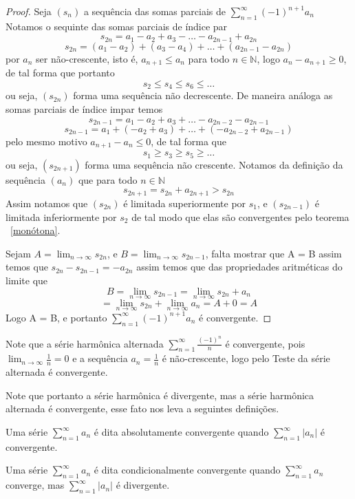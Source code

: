 \begin{proof}
    Seja $(s_n)$ a sequência das somas parciais de $\sum_{n =1}^{\infty} (-1)^{n+1} a_n$
    Notamos o sequinte das somas parciais de índice par
    $$s_{2n} = a_1 - a_2 +a_3 - \dots -a_{2n-1} + a_{2n}$$
    $$s_{2n} = (a_1 - a_2) + (a_3 - a_4) + \dots + (a_{2n-1} - a_{2n})$$
    por $a_n$ ser não-crescente, isto é, $a_{n+1} \leq a_n$ para todo $n \in \mathbb{N}$,
    logo $a_n - a_{n+1} \geq 0$, de tal forma que portanto
    $$s_2 \leq s_4 \leq s_6 \leq  \dots $$
    ou seja, $(s_{2n})$ forma uma sequência não decrescente.
    De maneira análoga as somas parciais de índice impar temos
    $$s_{2n-1} = a_1 - a_2 +a_3 + \dots -a_{2n-2} - a_{2n-1}$$
    $$s_{2n-1} =a_1 +(- a_2 + a_3) + \dots + (-a_{2n-2} + a_{2n-1})$$
    pelo mesmo motivo $a_{n+1} - a_n \leq 0$, de tal forma que
    $$s_1 \geq s_3 \geq s_5 \geq \dots $$
    ou seja, $(s_{2n+1})$ forma uma sequência não crescente.
    Notamos da definição da sequência $(a_n)$ que para todo $n \in \mathbb{N}$
    $$ s_{2n+1} = s_{2n} + a_{2n+1} > s_{2n}$$
    Assim notamos que $(s_{2n})$ é limitada superiormente por $s_1$, e
    $(s_{2n-1})$ é limitada inferiormente por $s_2$ de tal modo que elas são
    convergentes pelo teorema ~\ref{monótona}.
    
    Sejam $A = \lim_{n \to \infty} s_{2n}$, e $B = \lim_{n \to \infty} s_{2n-1}$, falta mostrar que A = B
    assim temos que $s_{2n} - s_{2n-1} = -a_{2n}$ assim temos que
    das propriedades aritméticas do limite que
    $$ B = \lim_{n \to \infty} s_{2n-1} = \lim_{n \to \infty} s_{2n} + a_n$$
    $$ = \lim_{n \to \infty} s_{2n} + \lim_{n \to \infty} a_n = A + 0 = A$$
    Logo A = B, e portanto $\sum_{n =1}^{\infty} (-1)^{n+1} a_n$ é convergente.
\end{proof}

\begin{ex}
    Note que a série harmônica alternada $\sum_{n = 1}^{\infty} \frac{(-1)^n}{n}$
    é convergente, pois $\lim_{n \to \infty} \frac{1}{n} = 0$ e a sequência 
    $a_n = \frac{1}{n}$ é não-crescente, logo pelo Teste da série alternada é
    convergente.
\end{ex}

Note que portanto a série harmônica é divergente, mas a série harmônica alternada
é convergente, esse fato nos leva a seguintes definições.

Uma série $\sum_{n =1}^{\infty} a_n$ é dita absolutamente convergente quando
$\sum_{n =1}^{\infty} |a_n|$ é convergente.

Uma série $\sum_{n =1}^{\infty} a_n$ é dita condicionalmente convergente quando
$\sum_{n =1}^{\infty} a_n$ converge, mas $\sum_{n =1}^{\infty} |a_n|$ é divergente.

